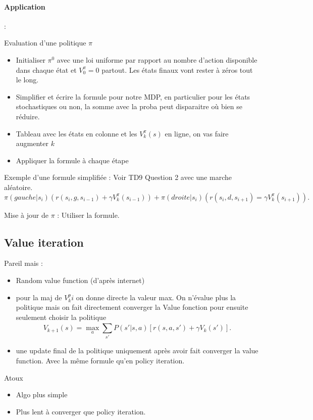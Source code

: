 \documentclass{article}
\begin{document}
\begin{multicols}{2}
\paragraph*{Application} : 

Evaluation d'une politique $ \pi $ 
\begin{itemize}
    \item Initialiser $ \pi ^0 $ avec une loi uniforme par rapport au nombre d'action disponible dans chaque état et $ V^\pi _0 = 0 $ partout. Les états finaux vont rester à zéros tout le long.
    \item Simplifier et écrire la formule pour notre MDP, en particulier pour les états stochastiques ou non, la somme avec la proba peut disparaitre où bien se réduire.
    \item Tableau avec les états en colonne et les $ V^\pi_k (s) $ en ligne, on vas faire augmenter $ k $ 
    \item Appliquer la formule à chaque étape
\end{itemize}
Exemple d'une formule simplifiée : Voir TD9 Question 2 avec une marche aléatoire. 
\[
    \pi (gauche | s_i) (r(s_i, g, s_{i-1}) + \gamma V_k^\pi (s_{i-1})) + \pi (droite | s_i) (r(s_i, d, s_{i+1}) = \gamma V_k^\pi (s_{i+1}))
.\]

Mise à jour de $ \pi $ : Utiliser la formule.

\subsection{Value iteration}
Pareil mais :\begin{itemize}
    \item Random value function (d'après internet)
    \item pour la maj de $ V_k^pi $ on donne directe la valeur max. On n'évalue plus la politique mais on fait directement converger la Value fonction pour ensuite seulement choisir la politique
    \[
        V_{k+1}(s) = \max _a \sum_{s'}^{}P(s'|s, a)[r(s,a,s') + \gamma V_k (s')]
    .\]
    \item une update final de la politique uniquement après avoir fait converger la value function. Avec la même formule qu'en policy iteration.
\end{itemize}
Atoux \begin{itemize}
    \item Algo plus simple
    \item Plus lent à converger que policy iteration.
\end{itemize}

\end{multicols}
\end{document}
